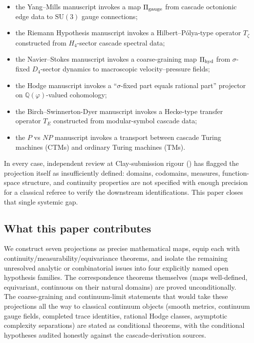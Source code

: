 \documentclass[11pt, a4paper]{amsart}
\theoremstyle{definition}
\newcommand{\Q}{\mathbb{Q}}
\newcommand{\pphi}{\varphi}
\newcommand{\hyd}{{\rm hyd}}
\newcommand{\gge}{{\rm gauge}}
\begin{document}
\begin{itemize}
\item the Yang--Mills manuscript \cite{MillenniumYM} invokes a map
  $\Pi_{\gge}$ from cascade octonionic edge data to $\mathrm{SU}(3)$
  gauge connections;
\item the Riemann Hypothesis manuscript \cite{MillenniumRH} invokes
  a Hilbert--P\'olya-type operator $T_\zeta$ constructed from
  $H_4$-sector cascade spectral data;
\item the Navier--Stokes manuscript \cite{MillenniumNS} invokes a
  coarse-graining map $\Pi_{\hyd}$ from $\sigma$-fixed $D_4$-sector
  dynamics to macroscopic velocity--pressure fields;
\item the Hodge manuscript \cite{MillenniumHodge} invokes a
  ``$\sigma$-fixed part equals rational part'' projector on
  $\Q(\pphi)$-valued cohomology;
\item the Birch--Swinnerton-Dyer manuscript \cite{MillenniumBSD}
  invokes a Hecke-type transfer operator $T_E$ constructed from
  modular-symbol cascade data;
\item the $P$ vs $NP$ manuscript \cite{MillenniumPNP} invokes a
  transport between cascade Turing machines (CTMs) and ordinary
  Turing machines (TMs).
\end{itemize}

In every case, independent review at Clay-submission rigour
(\cite[iteration 1, issue \#2]{CodexReview}) has flagged the
projection itself as insufficiently defined: domains, codomains,
measures, function-space structure, and continuity properties are
not specified with enough precision for a classical referee to
verify the downstream identifications. This paper closes that
single systemic gap.

\subsection{What this paper contributes}
\label{subsec:contribution}

We construct seven projections as precise mathematical maps,
equip each with continuity/measurability/equivariance theorems,
and isolate the remaining unresolved analytic or combinatorial
issues into four explicitly named open hypothesis families. The
correspondence theorems themselves (maps well-defined, equivariant,
continuous on their natural domains) are proved unconditionally.
The coarse-graining and continuum-limit statements that would take
these projections all the way to classical continuum objects
(smooth metrics, continuum gauge fields, completed trace identities,
rational Hodge classes, asymptotic complexity separations) are
stated as conditional theorems, with the conditional hypotheses
audited honestly against the cascade-derivation sources.
\end{document}
